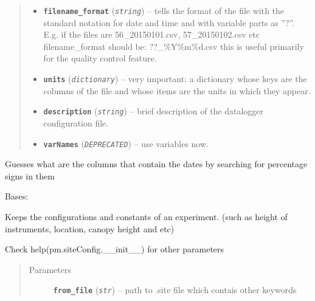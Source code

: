 \documentclass[a4paper,10pt,oneside]{sphinxmanual}
\begin{document}
\begin{fulllineitems}
\begin{quote}
\begin{description}
\begin{itemize}
\item {} 
\textbf{\texttt{filename\_format}} (\emph{\texttt{string}}) -- tells the format of the file with the standard notation for date and time and with variable
parts as ''?''. E.g. if the files are 56\_20150101.csv, 57\_20150102.csv etc filename\_format should be:
??\_\%Y\%m\%d.csv
this is useful primarily for the quality control feature.

\item {} 
\textbf{\texttt{units}} (\emph{\texttt{dictionary}}) -- very important: a dictionary whose keys are the columns of the file and whose items are
the units in which they appear.

\item {} 
\textbf{\texttt{description}} (\emph{\texttt{string}}) -- brief description of the datalogger configuration file.

\item {} 
\textbf{\texttt{varNames}} (\emph{\texttt{DEPRECATED}}) -- use variables now.

\end{itemize}

\end{description}\end{quote}

\begin{fulllineitems}
\label{pymicra:pymicra.core.fileConfig.get_date_cols}
Guesses what are the columns that contain the dates by searching
for percentage signs in them

\end{fulllineitems}


\end{fulllineitems}


\begin{fulllineitems}
\label{pymicra:pymicra.core.siteConfig}
Bases: 

Keeps the configurations and constants of an experiment. (such as height of instruments,
location, canopy height and etc)

Check help(pm.siteConfig.\_\_init\_\_) for other parameters
\begin{quote}\begin{description}
\item[{Parameters}] \leavevmode
\textbf{\texttt{from\_file}} (\emph{\texttt{str}}) -- path to .site file which contais other keywords

\end{description}\end{quote}

\end{fulllineitems}
\end{document}
